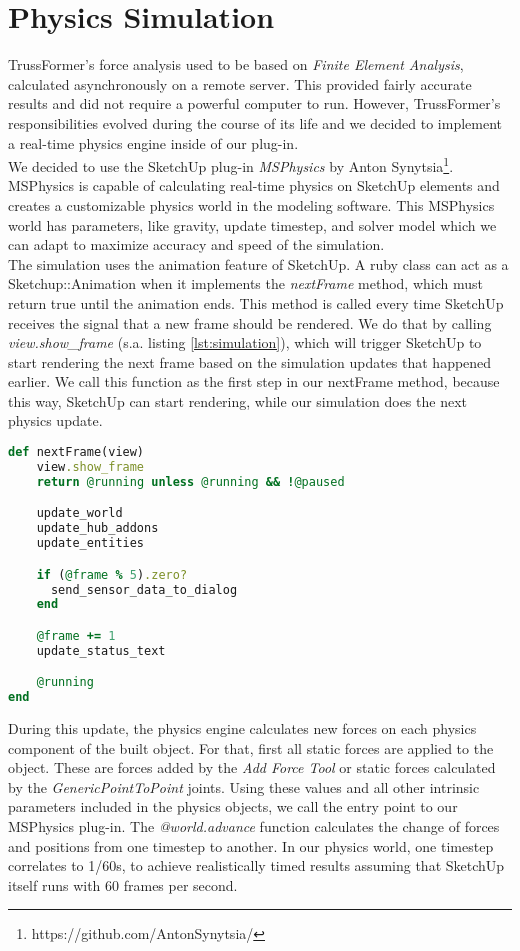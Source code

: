 \section{Physics Simulation}\label{sec:simulation}
TrussFormer's force analysis used to be based on \textit{Finite Element Analysis}, calculated asynchronously on a remote server. This provided fairly accurate results and did not require a powerful computer to run. However, TrussFormer's responsibilities evolved during the course of its life and we decided to implement a real-time physics engine inside of our plug-in.\\
We decided to use the SketchUp plug-in \textit{MSPhysics} by Anton Synytsia\footnote{https://github.com/AntonSynytsia/}. MSPhysics is capable of calculating real-time physics on SketchUp elements and creates a customizable physics world in the modeling software. This MSPhysics world has parameters, like gravity, update timestep, and solver model which we can adapt to maximize accuracy and speed of the simulation.\\
The simulation uses the animation feature of SketchUp. A ruby class can act as a Sketchup::Animation when it implements the \textit{nextFrame} method, which must return true until the animation ends. This method is called every time SketchUp receives the signal that a new frame should be rendered. We do that by calling \textit{view.show\_frame} (s.a. listing \ref{lst:simulation}), which will trigger SketchUp to start rendering the next frame based on the simulation updates that happened earlier. We call this function as the first step in our nextFrame method, because this way, SketchUp can start rendering, while our simulation does the next physics update.\\
\begin{lstlisting}[language=Ruby, label={lst:simulation}, caption=Simulation nextFrame method]
def nextFrame(view)
    view.show_frame
    return @running unless @running && !@paused

    update_world
    update_hub_addons
    update_entities

    if (@frame % 5).zero?
      send_sensor_data_to_dialog
    end

    @frame += 1
    update_status_text

    @running
end
\end{lstlisting}
During this update, the physics engine calculates new forces on each physics component of the built object. For that, first all static forces are applied to the object. These are forces added by the \textit{Add Force Tool} or static forces calculated by the \textit{GenericPointToPoint} joints. Using these values and all other intrinsic parameters included in the physics objects, we call the entry point to our MSPhysics plug-in. The \textit{@world.advance} function calculates the change of forces and positions from one timestep to another. In our physics world, one timestep correlates to 1/60s, to achieve realistically timed results assuming that SketchUp itself runs with 60 frames per second.\\

